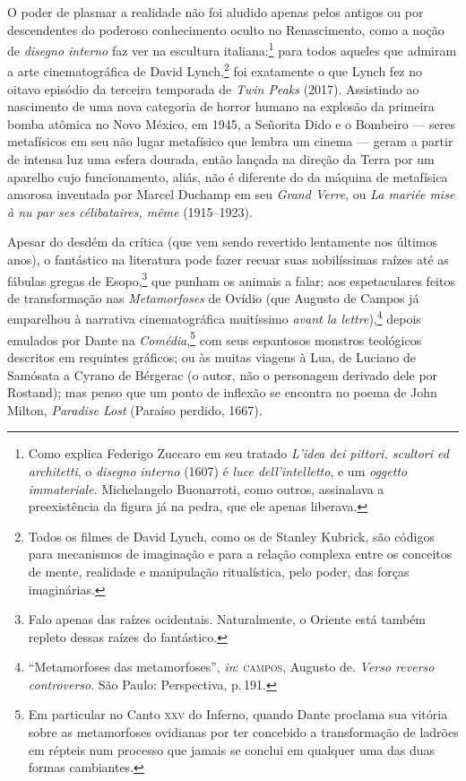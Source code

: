 O poder de plasmar a realidade não foi aludido apenas pelos antigos ou
por descendentes do poderoso conhecimento oculto no Renascimento, como a
noção de \emph{disegno interno} faz ver na escultura italiana:\footnote{Como
  explica Federigo Zuccaro em seu tratado \emph{L'idea dei
  pittori, scultori ed architetti}, o \emph{disegno interno} (1607) é
  \emph{luce dell'intelletto}, e um \emph{oggetto immateriale}.
  Michelangelo Buonarroti, como outros, assinalava a
  preexistência da figura já na pedra, que ele apenas liberava.} para
todos aqueles que admiram a arte cinematográfica de David
Lynch,\footnote{Todos os filmes de David Lynch, como os de Stanley
  Kubrick, são códigos para mecanismos de imaginação e para a relação
  complexa entre os conceitos de mente, realidade e manipulação
  ritualística, pelo poder, das forças imaginárias.} foi exatamente o
que Lynch fez no oitavo episódio da terceira temporada de
\emph{Twin Peaks} (2017). Assistindo ao nascimento de uma nova categoria
de horror humano na explosão da primeira bomba atômica no Novo México,
em 1945, a Señorita Dido e o Bombeiro --- seres metafísicos em seu
não lugar metafísico que lembra um cinema --- geram a partir de intensa
luz uma esfera dourada, então lançada na direção da Terra por um
aparelho cujo funcionamento, aliás, não é diferente do da máquina de
metafísica amorosa inventada por Marcel Duchamp em seu \emph{Grand
Verre}, ou \emph{La mariée mise à nu par ses célibataires, même}
(1915--1923).

Apesar do desdém da crítica (que vem sendo revertido lentamente nos
últimos anos), o fantástico na literatura pode fazer recuar suas
nobilíssimas raízes até as fábulas gregas de Esopo,\footnote{Falo apenas
  das raízes ocidentais. Naturalmente, o Oriente está também repleto
  dessas raízes do fantástico.} que punham os animais a falar; aos
espetaculares feitos de transformação nas \emph{Metamorfoses} de Ovídio
(que Augusto de Campos já emparelhou à narrativa cinematográfica
muitíssimo \emph{avant la lettre}),\footnote{``Metamorfoses das
  metamorfoses'', \emph{in}: \textsc{campos}, Augusto de. \emph{Verso reverso
  controverso}. São Paulo: Perspectiva, p.\,191.} depois emulados por
Dante na \emph{Comédia},\footnote{Em particular no Canto \textsc{xxv} do Inferno,
  quando Dante proclama sua vitória sobre as metamorfoses ovidianas por
  ter concebido a transformação de ladrões em répteis num processo que
  jamais se conclui em qualquer uma das duas formas cambiantes.} com
seus espantosos monstros teológicos descritos em requintes gráficos; ou
às muitas viagens à Lua, de Luciano de Samósata a Cyrano de Bérgerac (o
autor, não o personagem derivado dele por Rostand); mas penso que um
ponto de inflexão se encontra no poema de John Milton,
\emph{Paradise Lost} (Paraíso perdido, 1667).

